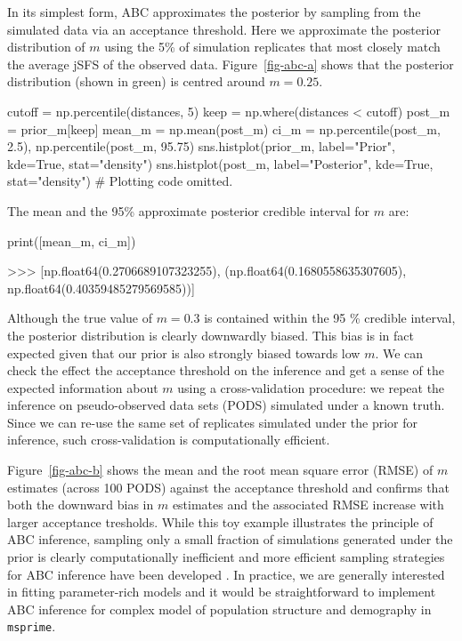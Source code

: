 \documentclass[graybox]{svmult}
\newcommand{\msprime}[0]{\texttt{msprime}}
\begin{document}
    In its simplest form, ABC approximates the posterior by sampling from
the simulated data via an acceptance threshold. Here we approximate the
posterior distribution of \(m\) using the 5\% of simulation replicates
that most closely match the average jSFS of the observed data.
Figure~\ref{fig-abc-a} shows that the posterior
distribution (shown in green) is centred around \(m=0.25\).
\begin{pythoncode}
cutoff = np.percentile(distances, 5)
keep = np.where(distances < cutoff)
post_m = prior_m[keep]
mean_m = np.mean(post_m)
ci_m = np.percentile(post_m, 2.5), np.percentile(post_m, 95.75)
sns.histplot(prior_m, label="Prior", kde=True,
    stat="density")
sns.histplot(post_m, label="Posterior", kde=True,
    stat="density")
# Plotting code omitted.
\end{pythoncode}

The mean and the 95\% approximate posterior credible interval for \(m\)
are:
\begin{pythoncode}
print([mean_m, ci_m])

>>> [np.float64(0.2706689107323255), (np.float64(0.1680558635307605), np.float64(0.40359485279569585))]
\end{pythoncode}


Although the true value of \(m=0.3\) is contained within the 95 \% credible interval, the posterior distribution is clearly downwardly biased. This bias is in fact expected given that our prior is also strongly biased towards low \(m\). We can check the effect the acceptance threshold on the inference and get a sense of the expected information about \(m\) using a cross-validation procedure: we repeat the inference on pseudo-observed data sets (PODS) simulated under a known truth. Since we can re-use the same set of replicates simulated under the prior for inference, such cross-validation is computationally efficient.

Figure~\ref{fig-abc-b} shows the mean and the root mean square error (RMSE) of \(m\) estimates (across 100 PODS) against the acceptance threshold and confirms that both the downward bias in \(m\) estimates and the associated RMSE increase with larger acceptance tresholds. While this toy example illustrates the principle of ABC inference, sampling only a small fraction of simulations generated under the prior is clearly computationally inefficient and more efficient sampling strategies for ABC inference have been developed \citep{Beaumont2002}. In practice, we are generally interested in fitting parameter-rich models and it would be straightforward to implement ABC inference for complex model of population structure and demography in \msprime.
\end{document}
